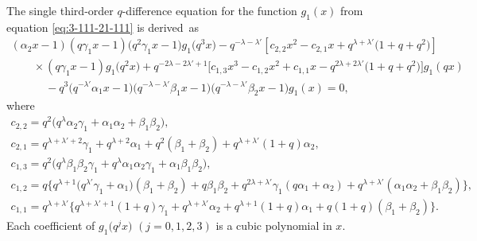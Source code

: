 \documentclass[pdftex]{sigma}
\numberwithin{equation}{section}
\theoremstyle{definition}
\begin{document}
The single third-order $q$-difference equation for the function $g_1(x)$ from equation \eqref{eq:3-111-21-111} is derived~as
\begin{gather}
(\alpha_2 x-1)(q \gamma_1 x-1)\bigl(q^2 \gamma_1 x-1\bigr) g_1\bigl(q^3x\bigr)- q^{-\lambda-\lambda'} [ c_{2,2} x^2
- c_{2,1} x + q^{\lambda + \lambda'}\bigl(1+q+q^2\bigr) ] \nonumber \\
\qquad\times
 (q \gamma_1 x-1) g_1\bigl(q^2x\bigr)+ q^{-2\lambda-2\lambda'+1} \big[ c_{1,3} x^3 - c_{1,2} x^2 + c_{1,1} x - q^{2\lambda+2\lambda'}\bigl(1+q+q^2\bigr) \big] g_1(qx) \nonumber \\
\phantom{\qquad\times}{}- q^3\bigl(q^{-\lambda'}\alpha_1 x - 1\bigr)\bigl(q^{-\lambda-\lambda'}\beta_1 x - 1\bigr)\bigl(q^{-\lambda-\lambda'}\beta_2 x - 1\bigr) g_1(x)=0, \label{eq:3-111-21-111-g1}
\end{gather}
where
\begin{gather*}
 c_{2,2} = q^2\bigl(q^{\lambda}\alpha_2\gamma_1 + \alpha_1\alpha_2 + \beta_1\beta_2\bigr), \\
 c_{2,1} = q^{\lambda + \lambda' + 2}\gamma_1 + q^{\lambda + 2}\alpha_1 + q^2(\beta_1 + \beta_2) + q^{\lambda + \lambda'}(1 + q)\alpha_2 , \\
 c_{1,3} = q^2\bigl(q^{\lambda}\beta_1\beta_2\gamma_1 + q^{\lambda}\alpha_1\alpha_2\gamma_1 + \alpha_1\beta_1\beta_2\bigr) , \\
 c_{1,2} = q \bigl\{q^{\lambda+1}\bigl(q^{\lambda'}\gamma_1 + \alpha_1\bigr)(\beta_1 + \beta_2) + q\beta_1\beta_2 + q^{2\lambda+\lambda'}\gamma_1(q\alpha_1 + \alpha_2) + q^{\lambda+\lambda'}(\alpha_1\alpha_2 + \beta_1\beta_2) \bigr\} , \\
 c_{1,1} = q^{\lambda+\lambda'} \bigl\{q^{\lambda+\lambda'+1}(1 + q)\gamma_1 + q^{\lambda+\lambda'}\alpha_2 + q^{\lambda+1}(1 + q)\alpha_1 + q(1 + q)(\beta_1 + \beta_2) \bigr\}.
\end{gather*}
Each coefficient of $g_1 \bigl(q^j x\bigr)$ $(j=0,1,2,3)$ is a cubic polynomial in $x$.
\end{document}

